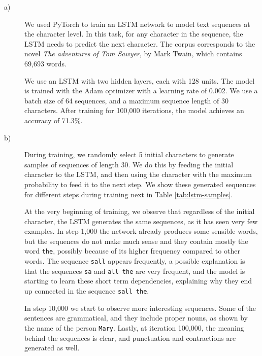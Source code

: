 \documentclass{article}
\begin{document}
\begin{description}
\item[a)] We used PyTorch to train an LSTM network to model text sequences at the character level. In this task, for any character in the sequence, the LSTM needs to predict the next character. The corpus corresponds to the novel \textit{The adventures of Tom Sawyer}, by Mark Twain, which contains 69,693 words.


We use an LSTM with two hidden layers, each with 128 units. The model is trained with the Adam optimizer \cite{kingma2014adam} with a learning rate of 0.002. We use a batch size of 64 sequences, and a maximum sequence length of 30 characters. After training for 100,000 iterations, the model achieves an accuracy of 71.3\%.

\item[b)] During training, we randomly select 5 initial characters to generate samples of sequences of length 30. We do this by feeding the initial character to the LSTM, and then using the character with the maximum probability to feed it to the next step. We show these generated sequences for different steps during training next in Table \ref{tab:lstm-samples}.

At the very beginning of training, we observe that regardless of the initial character, the LSTM generates the same sequences, as it has seen very few examples. In step 1,000 the network already produces some sensible words, but the sequences do not make much sense and they contain mostly the word \texttt{the}, possibly because of its higher frequency compared to other words. The sequence \texttt{sall} appears frequently, a possible explanation is that the sequences \texttt{sa} and \texttt{all the} are very frequent, and the model is starting to learn these short term dependencies, explaining why they end up connected in the sequence \texttt{sall the}.

In step 10,000 we start to observe more interesting sequences. Some of the sentences are grammatical, and they include proper nouns, as shown by the name of the person \texttt{Mary}. Lastly, at iteration 100,000, the meaning behind the sequences is clear, and punctuation and contractions are generated as well.



\end{description}
\end{document}
